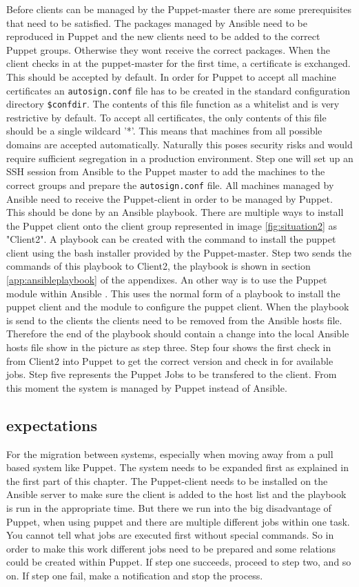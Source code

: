 Before clients can be managed by the Puppet-master there are some prerequisites that need to be satisfied. The packages managed by Ansible need to be reproduced in Puppet and the new clients need to be added to the correct Puppet groups. Otherwise they wont receive the correct packages. When the client checks in at the puppet-master for the first time, a certificate is exchanged. This should be accepted by default. In order for Puppet to accept all machine certificates an \texttt{autosign.conf} file has to be created in the standard configuration directory \texttt{\$confdir}. The contents of this file function as a whitelist and is very restrictive by default. To accept all certificates, the only contents of this file should be a single wildcard '*'. This means that machines from all possible domains are accepted automatically. Naturally this poses security risks and would require sufficient segregation in a production environment. Step one will set up an SSH session from Ansible to the Puppet master to add the machines to the correct groups and prepare the \texttt{autosign.conf} file. All machines managed by Ansible need to receive the Puppet-client in order to be managed by Puppet. This should be done by an Ansible playbook. There are multiple ways to install the Puppet client onto the client group represented in image \ref{fig:situation2} as "Client2". A playbook can be created with the command to install the puppet client using the bash installer provided by the Puppet-master. Step two sends the commands of this playbook to Client2, the playbook is shown in section \ref{app:ansibleplaybook} of the appendixes. An other way is to use the Puppet module within Ansible \cite{ansiblepuppet}. This uses the normal form of a playbook to install the puppet client and the module to configure the puppet client. When the playbook is send to the clients the clients need to be removed from the Ansible hosts file. Therefore the end of the playbook should contain a change into the local Ansible hosts file show in the picture as step three.  Step four shows the first check in from Client2 into Puppet to get the correct version and check in for available jobs. Step five represents the Puppet Jobs to be transfered to the client. From this moment the system is managed by Puppet instead of Ansible.    

\subsection{expectations}\label{subsec:expectations}
For the migration between systems, especially when moving away from a pull based system like Puppet. The system needs to be expanded first as explained in the first part of this chapter. The Puppet-client needs to be installed on the Ansible server to make sure the client is added to the host list and the playbook is run in the appropriate time. But there we run into the big disadvantage of Puppet, when using puppet and there are multiple different jobs within one task. You cannot tell what jobs are executed first without special commands. So in order to make this work different jobs need to be prepared and some relations could be created within Puppet. If step one succeeds, proceed to step two, and so on. If step one fail, make a notification and stop the process.   

